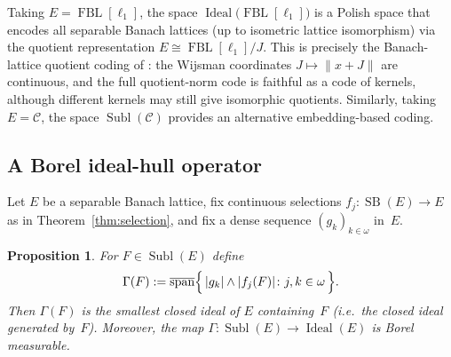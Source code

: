 \documentclass[12pt]{amsart}
\theoremstyle{plain}
\newtheorem{proposition}[theorem]{Proposition}
\theoremstyle{definition}
\theoremstyle{remark}
\DeclareMathOperator{\FBL}{FBL}
\DeclareMathOperator{\SB}{SB}
\DeclareMathOperator{\Subl}{Subl}
\DeclareMathOperator{\Ideal}{Ideal}
\begin{document}
Taking $E = \FBL[\ell_1]$, the space $\Ideal\bigl(\FBL[\ell_1]\bigr)$ is a
Polish space that encodes all separable Banach lattices (up to isometric lattice
isomorphism) via the quotient representation $E \cong \FBL[\ell_1] / J$.
This is precisely the Banach-lattice quotient coding of
\cite[Main Theorem~3.13 and Remark~5.1(c)]{Kan2026Pol}: the Wijsman coordinates
$J\mapsto\|x+J\|$ are continuous, and the full quotient-norm code is faithful as
a code of kernels, although different kernels may still give isomorphic
quotients.  Similarly, taking $E = \mathcal{C}$, the space
$\Subl(\mathcal{C})$ provides an alternative embedding-based coding.

\subsection{A Borel ideal-hull operator}\label{subsec:ideal-hull}

Let $E$ be a separable Banach lattice, fix continuous selections
$f_j \colon \SB(E) \to E$ as in Theorem~\ref{thm:selection}, and fix a dense
sequence $(g_k)_{k \in \omega}$ in~$E$.

\begin{proposition}\label{prop:ideal-hull}
For $F \in \Subl(E)$ define
\[
    \Gamma(F)
    := \overline{\mathrm{span}}\Bigl\{\,
    \lvert g_k \rvert \wedge \lvert f_j(F) \rvert
    \colon j, k \in \omega \,\Bigr\}.
\]
Then $\Gamma(F)$ is the smallest closed ideal of $E$ containing~$F$
(i.e.\ the closed ideal generated by~$F$).  Moreover, the map
$\Gamma \colon \Subl(E) \to \Ideal(E)$ is Borel measurable.
\end{proposition}
\end{document}
